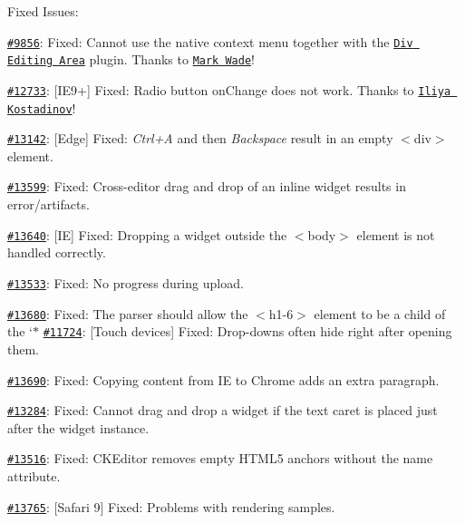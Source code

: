 Fixed Issues\+:


\begin{DoxyItemize}
\item \href{http://dev.ckeditor.com/ticket/9856}{\tt \#9856}\+: Fixed\+: Cannot use the native context menu together with the \href{http://ckeditor.com/addon/divarea}{\tt Div Editing Area} plugin. Thanks to \href{https://github.com/mark-wade}{\tt Mark Wade}!
\item \href{http://dev.ckeditor.com/ticket/12733}{\tt \#12733}\+: \mbox{[}I\+E9+\mbox{]} Fixed\+: Radio button {\ttfamily on\+Change} does not work. Thanks to \href{https://github.com/iliyakostadinov}{\tt Iliya Kostadinov}!
\item \href{http://dev.ckeditor.com/ticket/13142}{\tt \#13142}\+: \mbox{[}Edge\mbox{]} Fixed\+: {\itshape Ctrl+A} and then {\itshape Backspace} result in an empty {\ttfamily $<$div$>$} element.
\item \href{http://dev.ckeditor.com/ticket/13599}{\tt \#13599}\+: Fixed\+: Cross-\/editor drag and drop of an inline widget results in error/artifacts.
\item \href{http://dev.ckeditor.com/ticket/13640}{\tt \#13640}\+: \mbox{[}IE\mbox{]} Fixed\+: Dropping a widget outside the {\ttfamily $<$body$>$} element is not handled correctly.
\item \href{http://dev.ckeditor.com/ticket/13533}{\tt \#13533}\+: Fixed\+: No progress during upload.
\item \href{http://dev.ckeditor.com/ticket/13680}{\tt \#13680}\+: Fixed\+: The parser should allow the {\ttfamily $<$h1-\/6$>$} element to be a child of the `$\ast$ \href{http://dev.ckeditor.com/ticket/11724}{\tt \#11724}\+: \mbox{[}Touch devices\mbox{]} Fixed\+: Drop-\/downs often hide right after opening them.
\item \href{http://dev.ckeditor.com/ticket/13690}{\tt \#13690}\+: Fixed\+: Copying content from IE to Chrome adds an extra paragraph.
\item \href{http://dev.ckeditor.com/ticket/13284}{\tt \#13284}\+: Fixed\+: Cannot drag and drop a widget if the text caret is placed just after the widget instance.
\item \href{http://dev.ckeditor.com/ticket/13516}{\tt \#13516}\+: Fixed\+: C\+K\+Editor removes empty H\+T\+M\+L5 anchors without the {\ttfamily name} attribute.
\item \href{http://dev.ckeditor.com/ticket/13765}{\tt \#13765}\+: \mbox{[}Safari 9\mbox{]} Fixed\+: Problems with rendering samples.
\end{DoxyItemize}

